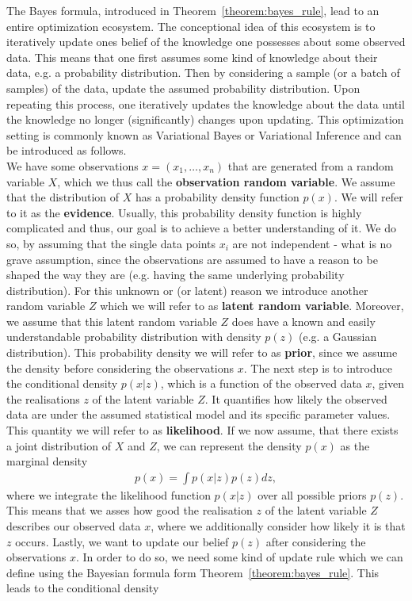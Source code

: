 The Bayes formula, introduced in Theorem~\ref{theorem:bayes_rule}, lead to an entire optimization ecosystem. The conceptional idea of this ecosystem is to iteratively update ones belief of the knowledge one possesses about some observed data. This means that one first assumes some kind of knowledge about their data, e.g. a probability distribution. Then by considering a sample (or a batch of samples) of the data, update the assumed probability distribution. Upon repeating this process, one iteratively updates the knowledge about the data until the knowledge no longer (significantly) changes upon updating. This optimization setting is commonly known as Variational Bayes or Variational Inference and can be introduced as follows.\\
We have some observations $x=(x_1,\ldots, x_n)$ that are generated from a random variable $X$, which we thus call the \textbf{observation random variable}. We assume that the distribution of $X$ has a probability density function $p(x)$. We will refer to it as the \textbf{evidence}. Usually, this probability density function is highly complicated and thus, our goal is to achieve a better understanding of it. We do so, by assuming that the single data points $x_i$ are not independent - what is no grave assumption, since the observations are assumed to have a reason to be shaped the way they are (e.g. having the same underlying probability distribution). For this unknown or (or latent) reason we introduce another random variable $Z$ which we will refer to as \textbf{latent random variable}. Moreover, we assume that this latent random variable $Z$ does have a known and \glqq easily understandable\grqq{} probability distribution with density $p(z)$ (e.g. a Gaussian distribution). This probability density we will refer to as \textbf{prior}, since we assume the density before considering the observations $x$. The next step is to introduce the conditional density $p(x|z)$, which is a function of the observed data $x$, given the realisations $z$ of the latent variable $Z$. It quantifies how likely the observed data are under the assumed statistical model and its specific parameter values. This quantity we will refer to as \textbf{likelihood}. If we now assume, that there exists a joint distribution of $X$ and $Z$, we can represent the density $p(x)$ as the marginal density
\begin{align}\label{eq:evidence}
p(x) = \int p(x|z) p(z) dz,
\end{align}
where we integrate the likelihood function $p(x|z)$ over all possible priors $p(z)$. This means that we asses how good the realisation $z$ of the latent variable $Z$ describes our observed data $x$, where we additionally consider how likely it is that $z$ occurs. Lastly, we want to update our belief $p(z)$ after considering the observations $x$. In order to do so, we need some kind of update rule which we can define using the Bayesian formula form Theorem~\ref{theorem:bayes_rule}. This leads to the conditional density
